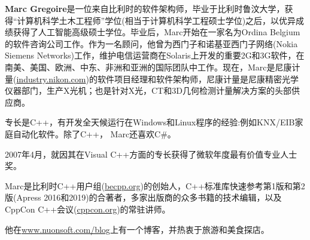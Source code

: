 \textbf{Marc Gregoire}是一位来自比利时的软件架构师，毕业于比利时鲁汶大学，获得“计算机科学土木工程师”学位(相当于计算机科学工程硕士学位)之后，以优异成绩获得了人工智能高级硕士学位。毕业后，Marc开始在一家名为Ordina Belgium的软件咨询公司工作。作为一名顾问，他曾为西门子和诺基亚西门子网络(Nokia Siemens Networks)工作，维护电信运营商在Solaris上开发的重要2G和3G软件，在南美、美国、欧洲、中东、非洲和亚洲的国际团队中工作。现在，Marc是尼康计量(\href{http://industry.nikon.com/}{industry.nikon.com})的软件项目经理和软件架构师，尼康计量是尼康精密光学仪器部门，生产X光机；也是针对X光，CT和3D几何检测计量解决方案的头部供应商。

专长是C++，有开发全天候运行在Windows和Linux程序的经验:例如KNX/EIB家庭自动化软件。除了C++， Marc还喜欢C\#。

2007年4月，就因其在Visual C++方面的专长获得了微软年度最有价值专业人士奖。

Marc是比利时C++用户组(\href{http://becpp.org/}{becpp.org})的创始人，C++标准库快速参考第1版和第2版(Apress 2016和2019)的合著者，多家出版商的众多书籍的技术编辑，以及CppCon C++会议(\href{http://cppcon.org/}{cppcon.org})的常驻讲师。

他在\href{http://www.nuonsoft.com/blog}{www.nuonsoft.com/blog}上有一个博客，并热衷于旅游和美食探店。